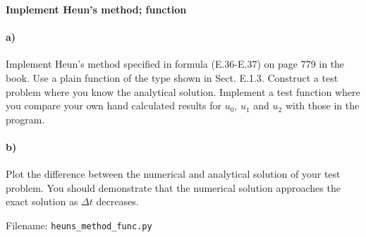 \begin{Problem}{\textbf{Implement Heun's method; function}}
\paragraph{a)}
\noindent
Implement Heun's method specified in formula (E.36-E.37) on page 779 in the book. Use a plain function  of the type shown in Sect. E.1.3. Construct a test problem where you know the analytical solution. 
Implement a test function  where you compare your own hand calculated results for $u_0$, $u_1$ and $u_2$ with those in the program.

\paragraph{b)}
Plot the difference between the numerical and analytical solution of your test problem. You should demonstrate that the numerical solution approaches the exact solution as $\Delta t$ decreases.

Filename: \texttt{heuns\_method\_func.py}
\end{Problem}


